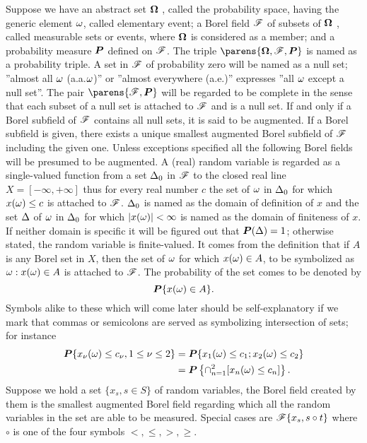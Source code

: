 Suppose we have an abstract set $ \boldsymbol{\Omega} $ , called the probability space, having the generic element $ \omega $, called elementary event; a Borel field $\mathscr{F} $ of subsets of $ \boldsymbol{\Omega} $ , called measurable sets or events, where $\boldsymbol{\Omega}$ is considered as a member; and a probability measure $\boldsymbol{P} $ defined on $\mathscr{F} $. The triple $\parens{\probspace, \Borelfield, \probmeasure} $ is named as a probability triple. A set in $\mathscr{F}$ of probability zero will be named as a null set; ''almost all $\omega$ (a.a.$\omega$)'' or ''almost everywhere (a.e.)'' expresses ''all $\omega$ except a null set''. The pair $\parens{\Borelfield, \probmeasure} $ will be regarded to be complete in the sense that each subset of a null set is attached to $\mathscr{F}$ and is a null set. If and only if a Borel subfield of $\mathscr{F}$ contains all null sets, it is said to be augmented. If a Borel subfield is given, there exists a unique smallest augmented Borel subfield of $\mathscr{F}$ including the given one. Unless exceptions specified all the following Borel fields will be presumed to be augmented. A (real) random variable is regarded as a single-valued function from a set $\Delta_0$ in $\mathscr{F}$ to the closed real line $X = [-\infty,+\infty]$ thus for every real number $c $ the set of $\omega$ in $\Delta_0$ for which $x(\omega) \leq c$ is attached to $\mathscr{F}$. $\Delta_0$ is named as the domain of definition of $x$ and the set $\Delta$ of $\omega$ in $\Delta_0$ for which $|x(\omega)|<\infty$ is named as the domain of finiteness of $x$. If neither domain is specific it will be figured out that $\boldsymbol{P}(\Delta)=1$; otherwise stated, the random variable is finite-valued. It comes from the definition that if $A$ is any Borel set in $X$, then the set of $\omega $ for which $x(\omega)\in A$, to be symbolized as ${\omega:x(\omega)\in A}$ is attached to $\mathscr{F}$. The probability of the set comes to be denoted by
\begin{equation}
\boldsymbol{P} \{ x(\omega)\in A \}.
\end{equation}
Symbols alike to these which will come later should be self-explanatory if we mark that commas or semicolons are served as symbolizing intersection of sets; for instance
\begin{equation}
    \begin{aligned}
    \boldsymbol{P}\{x_\nu(\omega)\leq c_\nu,1\leq \nu\leq 2\}&=\boldsymbol{P}\{x_1(\omega)\leq c_1; x_2(\omega)\leq c_2\} \\ &= \boldsymbol{P}\left\{\cap_{n=1}^2 [x_n(\omega)\leq c_n]\right\}.
    \end{aligned}
\end{equation}
Suppose we hold a set $\{x_s, s\in S\}$ of random variables, the Borel field created by them is the smallest augmented Borel field regarding which all the random variables in the set are able to be measured. Special cases are $\mathscr{F}\{x_s,s\circ t\}$ where $\circ$ is one of the four symbols $<, \leq , >, \geq$.

